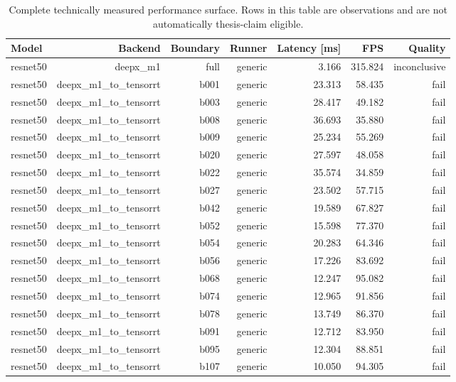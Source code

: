 \begin{table}[t]
\centering
\small
\caption{Complete technically measured performance surface. Rows in this table are observations and are not automatically thesis-claim eligible.}
\label{tab:performance-observations}
\begin{tabular}{lrrrrrr}
\toprule
Model & Backend & Boundary & Runner & Latency [ms] & FPS & Quality \\
\midrule
resnet50 & deepx\_m1 & full & generic & 3.166 & 315.824 & inconclusive \\
resnet50 & deepx\_m1\_to\_tensorrt & b001 & generic & 23.313 & 58.435 & fail \\
resnet50 & deepx\_m1\_to\_tensorrt & b003 & generic & 28.417 & 49.182 & fail \\
resnet50 & deepx\_m1\_to\_tensorrt & b008 & generic & 36.693 & 35.880 & fail \\
resnet50 & deepx\_m1\_to\_tensorrt & b009 & generic & 25.234 & 55.269 & fail \\
resnet50 & deepx\_m1\_to\_tensorrt & b020 & generic & 27.597 & 48.058 & fail \\
resnet50 & deepx\_m1\_to\_tensorrt & b022 & generic & 35.574 & 34.859 & fail \\
resnet50 & deepx\_m1\_to\_tensorrt & b027 & generic & 23.502 & 57.715 & fail \\
resnet50 & deepx\_m1\_to\_tensorrt & b042 & generic & 19.589 & 67.827 & fail \\
resnet50 & deepx\_m1\_to\_tensorrt & b052 & generic & 15.598 & 77.370 & fail \\
resnet50 & deepx\_m1\_to\_tensorrt & b054 & generic & 20.283 & 64.346 & fail \\
resnet50 & deepx\_m1\_to\_tensorrt & b056 & generic & 17.226 & 83.692 & fail \\
resnet50 & deepx\_m1\_to\_tensorrt & b068 & generic & 12.247 & 95.082 & fail \\
resnet50 & deepx\_m1\_to\_tensorrt & b074 & generic & 12.965 & 91.856 & fail \\
resnet50 & deepx\_m1\_to\_tensorrt & b078 & generic & 13.749 & 86.370 & fail \\
resnet50 & deepx\_m1\_to\_tensorrt & b091 & generic & 12.712 & 83.950 & fail \\
resnet50 & deepx\_m1\_to\_tensorrt & b095 & generic & 12.304 & 88.851 & fail \\
resnet50 & deepx\_m1\_to\_tensorrt & b107 & generic & 10.050 & 94.305 & fail \\

\end{tabular}
\end{table}
